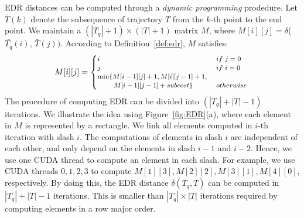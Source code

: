 \documentclass[10pt,conference,letterpaper]{IEEEtran}
\newcommand{\edr}{{\delta}\xspace}
\newcommand{\bigoh}{{\rm O}\xspace}
\begin{document}
EDR distances can be computed through a \emph{dynamic programming} prodedure. Let $\bar{T}(k)$ denote the subsequence of trajectory $T$ from the $k$-th point to the end point.
We maintain a $(|T_q|+1)\times (|T|+1)$ matrix $M$, where $M[i][j]=\edr$($\bar{T_q}(i)$, $\bar{T}(j))$. According to Definition~\ref{def:edr}, $M$ satisfies:
\begin{equation}
\scriptsize
M[i][j]=
\begin{cases}
i &\mbox{~if~}j=0\\
j &\mbox{~if~}i=0\\
\min\{M[i-1][j]+1, M[i][j-1]+1, &\\
~~~~~~~M[i-1][j-1]+subcost \} &\mbox{~otherwise~}
\end{cases}
\end{equation}
%
%
The procedure of computing EDR can be divided into $(|T_q|+|T|-1)$ iterations. We illustrate the idea using Figure~\ref{fig:EDR}(a), where each element in $M$ is represented by a rectangle. We link all elements computed in $i$-th iteration with slash $i$. The computations of elements in slash $i$ are independent of each other, and only depend on the elements in slash $i-1$ and $i-2$.
Hence, we use one CUDA thread to compute an element in each slash.
For example, we use CUDA threads $0, 1,2,3$ to compute $M[1][3],M[2][2],M[3][1], M[4][0]$, respectively.
By doing this, the EDR distance $\edr(T_q, T)$ can be computed in $|T_q|+|T|-1$ iterations. This is smaller than $|T_q|\times |T|$ iterations required by computing elements in a row major order.
\end{document}
